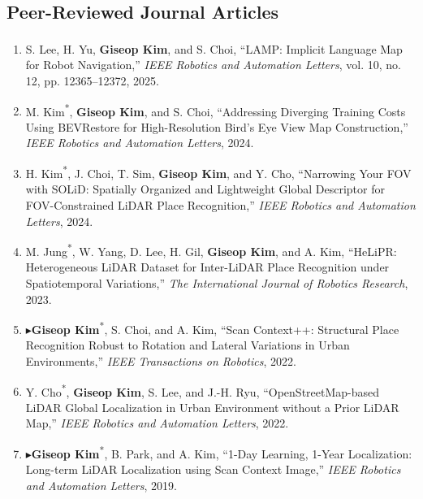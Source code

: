 \documentclass[10pt,a4paper]{article}
\newcommand{\pub}[1]{\item #1}
\newcommand{\leadpub}{\textbf{\ensuremath{\blacktriangleright}}\hspace{0.25em}}
\newcommand{\me}{\textbf{Giseop Kim}}
\newcommand{\corr}{\textsuperscript{\dag}}
\newcommand{\first}{\textsuperscript{*}}
\begin{document}
\subsection{Peer-Reviewed Journal Articles}
\begin{enumerate}
\pub{S. Lee, H. Yu, \me, and S. Choi\corr, ``LAMP: Implicit Language Map for Robot Navigation,'' \textit{IEEE Robotics and Automation Letters}, vol. 10, no. 12, pp. 12365--12372, 2025.}
\pub{M. Kim\first, \me, and S. Choi\corr, ``Addressing Diverging Training Costs Using BEVRestore for High-Resolution Bird's Eye View Map Construction,'' \textit{IEEE Robotics and Automation Letters}, 2024.}
\pub{H. Kim\first, J. Choi, T. Sim, \me, and Y. Cho\corr, ``Narrowing Your FOV with SOLiD: Spatially Organized and Lightweight Global Descriptor for FOV-Constrained LiDAR Place Recognition,'' \textit{IEEE Robotics and Automation Letters}, 2024.}
\pub{M. Jung\first, W. Yang, D. Lee, H. Gil, \me, and A. Kim\corr, ``HeLiPR: Heterogeneous LiDAR Dataset for Inter-LiDAR Place Recognition under Spatiotemporal Variations,'' \textit{The International Journal of Robotics Research}, 2023.}
\pub{\leadpub \me\first, S. Choi, and A. Kim\corr, ``Scan Context++: Structural Place Recognition Robust to Rotation and Lateral Variations in Urban Environments,'' \textit{IEEE Transactions on Robotics}, 2022.}
\pub{Y. Cho\first, \me, S. Lee, and J.-H. Ryu\corr, ``OpenStreetMap-based LiDAR Global Localization in Urban Environment without a Prior LiDAR Map,'' \textit{IEEE Robotics and Automation Letters}, 2022.}
\pub{\leadpub \me\first, B. Park, and A. Kim\corr, ``1-Day Learning, 1-Year Localization: Long-term LiDAR Localization using Scan Context Image,'' \textit{IEEE Robotics and Automation Letters}, 2019.}
\end{enumerate}
\end{document}

